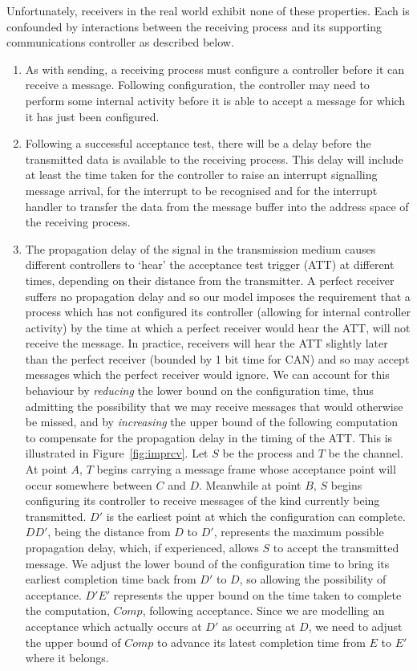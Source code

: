 Unfortunately, receivers in the real world exhibit none of these
properties.  Each is confounded by interactions between the receiving
process and its supporting communications controller as described
below.
\begin{enumerate}
\item As with sending, a receiving process must configure a controller
before it can receive a message. Following configuration, the controller
may need to perform some internal activity before it is able to accept
a message for which it has just been configured.
\item Following a successful acceptance test, there will be a delay before
the transmitted data is available to the receiving process. This delay
will include at least the time taken for the controller to raise an 
interrupt signalling message arrival, for the interrupt to be recognised
and for the interrupt handler to transfer the data from the message buffer
into the address space of the receiving process. 
\item The propagation delay of the signal in the transmission medium causes
different controllers to `hear' the acceptance test trigger (ATT) at
different times, depending on their distance from the transmitter. A
perfect receiver suffers no propagation delay and so our model imposes
the requirement that a process which has not configured its controller
(allowing for internal controller activity) by the time at which a
perfect receiver would hear the ATT, will not receive the message. In
practice, receivers will hear the ATT slightly later than the perfect
receiver (bounded by 1 bit time for CAN) and so may accept messages
which the perfect receiver would ignore. We can account for this
behaviour by {\em reducing\/} the lower bound on the configuration
time, thus admitting the possibility that we may receive messages that
would otherwise be missed, and by {\em increasing\/} the upper bound
of the following computation to compensate for the propagation delay
in the timing of the ATT. This is illustrated in
Figure~\ref{fig:imprcv}.  Let $S$ be the process and $T$ be the
channel. At point $A$, $T$ begins carrying a message frame whose
acceptance point will occur somewhere between $C$ and $D$. Meanwhile
at point $B$, $S$ begins configuring its controller to receive
messages of the kind currently being transmitted. $D'$ is the earliest
point at which the configuration can complete. $DD'$, being the
distance from $D$ to $D'$, represents the maximum possible propagation
delay, which, if experienced, allows $S$ to accept the transmitted
message. We adjust the lower bound of the configuration time to bring
its earliest completion time back from $D'$ to $D$, so allowing the
possibility of acceptance. $D'E'$ represents the upper bound on the
time taken to complete the computation, $Comp$, following acceptance.
Since we are modelling an acceptance which actually occurs at $D'$ as
occurring at $D$, we need to adjust the upper bound of $Comp$ to
advance its latest completion time from $E$ to $E'$ where it belongs.
\end{enumerate}
